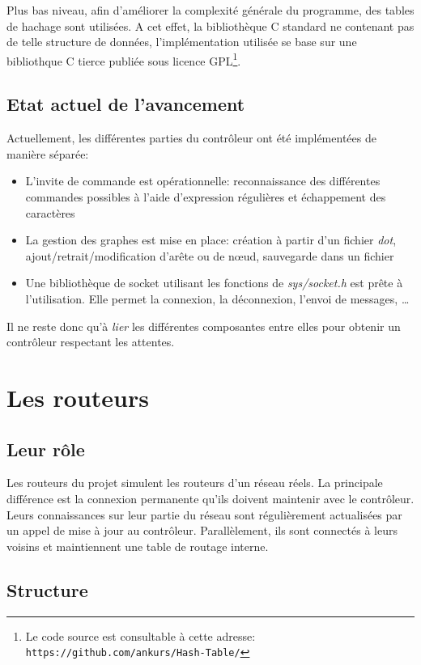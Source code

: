 \documentclass[a4paper,11pt]{article}
\begin{document}
Plus bas niveau, afin d'améliorer la complexité générale du programme, des tables de hachage sont utilisées. A cet effet, la bibliothèque C standard ne contenant pas de telle structure de données, l'implémentation utilisée se base sur une bibliothque C tierce publiée sous licence GPL\footnote{Le code source est consultable à cette adresse: \texttt{https://github.com/ankurs/Hash-Table/}}.

\subsection{Etat actuel de l'avancement}
\label{implementation_controleur}

Actuellement, les différentes parties du contrôleur ont été implémentées de manière séparée:
\begin{itemize}
 \item L'invite de commande est opérationnelle: reconnaissance des différentes commandes possibles à l'aide d'expression régulières et échappement des caractères
 \item La gestion des graphes est mise en place: création à partir d'un fichier \textit{dot}, ajout/retrait/modification d'arête ou de n\oe ud, sauvegarde dans un fichier
 \item Une bibliothèque de socket utilisant les fonctions de \textit{sys/socket.h} est prête à l'utilisation. Elle permet la connexion, la déconnexion, l'envoi de messages, \dots
\end{itemize}
Il ne reste donc qu'à \textit{lier} les différentes composantes entre elles pour obtenir un contrôleur respectant les attentes.


\section{Les routeurs}

\subsection{Leur rôle}

Les routeurs du projet simulent les routeurs d'un réseau réels. La principale différence est la connexion permanente qu'ils doivent maintenir avec le contrôleur. Leurs connaissances sur leur partie du réseau sont régulièrement actualisées par un appel de mise à jour au contrôleur. Parallèlement, ils sont connectés à leurs voisins et maintiennent une table de routage interne.

\subsection{Structure}
\end{document}
